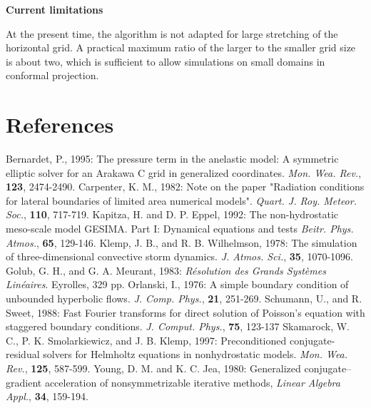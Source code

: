 {\bf Current limitations}

At the present time, the algorithm is not adapted for large stretching
of the horizontal grid. A practical maximum ratio of the larger to the
smaller grid size is about two, which is sufficient to allow simulations
on small domains in conformal projection.

\section{References}
\decrefname
Bernardet, P., 1995:
The pressure term in the anelastic model:
A symmetric elliptic solver for an Arakawa C grid in generalized coordinates.
{\it Mon. Wea. Rev.}, {\bf 123}, 2474-2490.
\decrefname
Carpenter, K. M., 1982:
Note on the paper "Radiation conditions for lateral boundaries
of limited area numerical models".
{\it Quart. J. Roy. Meteor. Soc.}, {\bf 110}, 717-719.
\decrefname
Kapitza, H. and D. P. Eppel, 1992:
The non-hydrostatic meso-scale model GESIMA.
Part I: Dynamical equations and tests
{\it Beitr. Phys. Atmos.}, {\bf 65}, 129-146.
\decrefname
Klemp, J. B., and R. B. Wilhelmson, 1978:
The simulation of three-dimensional convective storm dynamics.
{\it J. Atmos. Sci.}, {\bf 35}, 1070-1096.
\decrefname
Golub, G. H., and G. A. Meurant, 1983:
{\it R\'esolution des Grands Syst\`emes Lin\'eaires}.
Eyrolles, 329 pp.
\decrefname
Orlanski, I., 1976:
A simple boundary condition of unbounded hyperbolic flows.
{\it J. Comp. Phys.}, {\bf 21}, 251-269.
\decrefname
Schumann, U., and R. Sweet, 1988:
Fast Fourier transforms for direct solution of Poisson's equation
with staggered boundary conditions.
{\it J. Comput. Phys.}, {\bf 75}, 123-137
\decrefname
Skamarock, W. C., P. K. Smolarkiewicz, and J. B. Klemp, 1997:
Preconditioned conjugate-residual solvers for Helmholtz equations in
nonhydrostatic models.
{\it Mon. Wea. Rev.}, {\bf 125}, 587-599.
\decrefname
Young, D. M. and K. C. Jea, 1980:
Generalized conjugate--gradient acceleration
of nonsymmetrizable iterative methods,
{\it Linear Algebra Appl.}, {\bf 34}, 159-194.